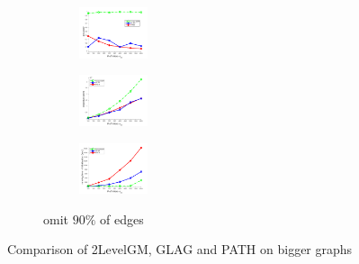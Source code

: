 \documentclass[hyperref={pdfpagelabels=false}]{beamer}
\begin{document}
\begin{frame}[allowframebreaks]
\begin{figure}[h]
\begin{subfigure}[b]{0.32\textwidth}
			\includegraphics[width=2.0cm]{"fig/evaluation/SyntheticTest_BigGraphs/descr/Results_v4.3.3/Test3/accuracy_avg1t"} 
		\end{subfigure}
		\begin{subfigure}[b]{0.32\textwidth}
			\centering
			\includegraphics[width=2.0cm]{"fig/evaluation/SyntheticTest_BigGraphs/descr/Results_v4.3.3/Test3/score_avg1t"} 
		\end{subfigure} 
		\begin{subfigure}[b]{0.32\textwidth}
			\centering
			\includegraphics[width=2.0cm]{"fig/evaluation/SyntheticTest_BigGraphs/descr/Results_v4.3.3/Test3/time_summary_avg1t"} 
		\end{subfigure} 	\vspace{-10pt}
	\caption*{\tiny omit $90\%$ of edges}
\end{figure}
Comparison of 2LevelGM, GLAG and PATH on bigger graphs
\end{frame}
\end{document}
